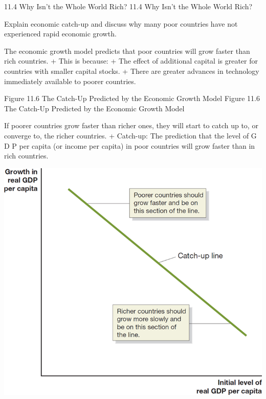 \documentclass[
  12pt,
  ignorenonframetext,
]{beamer}
\begin{document}
\begin{frame}{11.4 Why Isn't the Whole World Rich?}
\protect\hypertarget{why-isnt-the-whole-world-rich}{}
11.4 Why Isn't the Whole World Rich?

Explain economic catch-up and discuss why many poor countries have not
experienced rapid economic growth.

The economic growth model predicts that poor countries will grow faster
than rich countries. + This is because: + The effect of additional
capital is greater for countries with smaller capital stocks. + There
are greater advances in technology immediately available to poorer
countries.
\end{frame}

\begin{frame}{Figure 11.6 The Catch-Up Predicted by the Economic Growth
Model}
\protect\hypertarget{figure-11.6-the-catch-up-predicted-by-the-economic-growth-model}{}
Figure 11.6 The Catch-Up Predicted by the Economic Growth Model

If poorer countries grow faster than richer ones, they will start to
catch up to, or converge to, the richer countries. + Catch-up: The
prediction that the level of G D P per capita (or income per capita) in
poor countries will grow faster than in rich countries.

\includegraphics[width=\textwidth,height=0.99\textheight]{imgs3/img_slide37a.png}
\end{frame}
\end{document}
